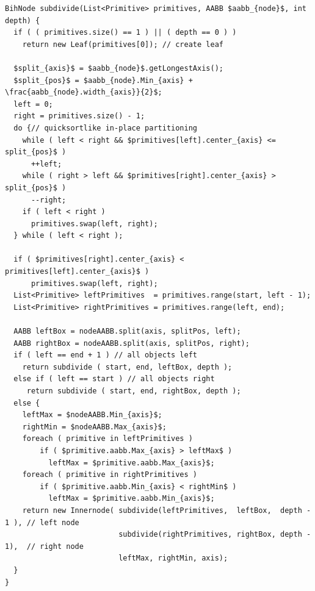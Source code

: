 \begin{lstlisting}[belowcaptionskip=8pt,float,mathescape=true,caption={[Konstruktion einer BIH mit globaler Heuristik]Konstruktion einer BIH mit der von Wächter vorgeschlagenen globalen Heuristik},label=constrbih]
BihNode subdivide(List<Primitive> primitives, AABB $aabb_{node}$, int depth) {
  if ( ( primitives.size() == 1 ) || ( depth == 0 ) ) 
    return new Leaf(primitives[0]); // create leaf

  $split_{axis}$ = $aabb_{node}$.getLongestAxis();
  $split_{pos}$ = $aabb_{node}.Min_{axis} + \frac{aabb_{node}.width_{axis}}{2}$;
  left = 0;
  right = primitives.size() - 1;
  do {// quicksortlike in-place partitioning
    while ( left < right && $primitives[left].center_{axis} <= split_{pos}$ ) 
      ++left;
    while ( right > left && $primitives[right].center_{axis} > split_{pos}$ )
      --right;
    if ( left < right ) 
      primitives.swap(left, right);
  } while ( left < right );

  if ( $primitives[right].center_{axis} < primitives[left].center_{axis}$ )
      primitives.swap(left, right);
  List<Primitive> leftPrimitives  = primitives.range(start, left - 1);
  List<Primitive> rightPrimitives = primitives.range(left, end);

  AABB leftBox = nodeAABB.split(axis, splitPos, left);
  AABB rightBox = nodeAABB.split(axis, splitPos, right);
  if ( left == end + 1 ) // all objects left
    return subdivide ( start, end, leftBox, depth );
  else if ( left == start ) // all objects right
     return subdivide ( start, end, rightBox, depth );
  else {
    leftMax = $nodeAABB.Min_{axis}$;
    rightMin = $nodeAABB.Max_{axis}$;
    foreach ( primitive in leftPrimitives )
        if ( $primitive.aabb.Max_{axis} > leftMax$ )
          leftMax = $primitive.aabb.Max_{axis}$;
    foreach ( primitive in rightPrimitives )
        if ( $primitive.aabb.Min_{axis} < rightMin$ )
          leftMax = $primitive.aabb.Min_{axis}$;
    return new Innernode( subdivide(leftPrimitives,  leftBox,  depth - 1 ), // left node
                          subdivide(rightPrimitives, rightBox, depth - 1),  // right node
                          leftMax, rightMin, axis);
  }
}
\end{lstlisting}

